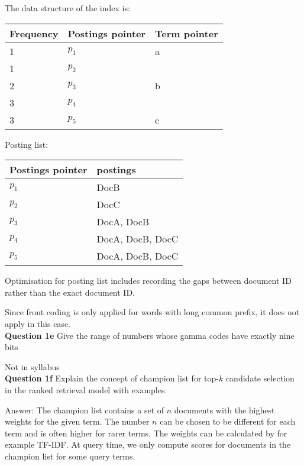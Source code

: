 \documentclass[11pt,a4paper]{report}
\begin{document}
\begin{multicols*}{2}
\noindent The data structure of the index is:

\begin{center}
\begin{tabular}{ | l | l | l |} 
    \hline
    Frequency & Postings pointer & Term pointer \\
    \hline
    1 & $p_1$ & a\\
    1 & $p_2$ & \\
    2 & $p_3$ & b\\
    3 & $p_4$ & \\
    3 & $p_5$ & c\\
    \hline
\end{tabular}
\end{center}

\noindent Posting list:
\begin{center}
\begin{tabular}{ | l | l |} 
    \hline
    Postings pointer & postings \\
    \hline
    $p_1$ & DocB\\
    $p_2$ & DocC\\
    $p_3$ & DocA, DocB\\
    $p_4$ & DocA, DocB, DocC\\
    $p_5$ & DocA, DocB, DocC\\
    \hline
\end{tabular}
\end{center}

\noindent Optimisation for posting list includes recording the gaps between document ID rather than the exact document ID. 

\noindent Since front coding is only applied for words with long common prefix, it does not apply in this case.\\

\noindent \textbf{Question 1e} Give the range of numbers whose gamma codes have exactly nine bits

\noindent Not in syllabus \\

\noindent \textbf{Question 1f} Explain the concept of champion list for top-$k$ candidate selection in the ranked retrieval model with examples. 

\noindent Answer: The champion list contains a set of $n$ documents with the highest weights for the given term. The number $n$ can be chosen to be different for each term and is often higher for rarer terms. The weights can be calculated by for example TF-IDF. At query time, we only compute scores for documents in the champion list for some query terms.


\end{multicols*}
\end{document}
